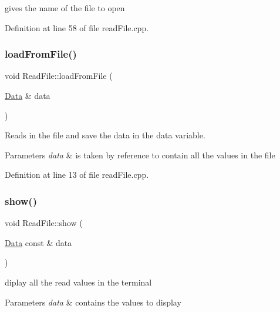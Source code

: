 gives the name of the file to open 



Definition at line 58 of file read\+File.\+cpp.

\mbox{\label{class_read_file_a232df426223b84e4dbb3f964ee4c3177}} 
\subsubsection{\texorpdfstring{load\+From\+File()}{loadFromFile()}}
{\footnotesize\ttfamily void Read\+File\+::load\+From\+File (\begin{DoxyParamCaption}\item[{\mbox{\hyperlink{struct_data}{Data}} \&}]{data }\end{DoxyParamCaption})}



Reads in the file and save the data in the data variable. 


\begin{DoxyParams}{Parameters}
{\em data} & is taken by reference to contain all the values in the file \\
\hline
\end{DoxyParams}


Definition at line 13 of file read\+File.\+cpp.

\mbox{\label{class_read_file_a5efc41b900510ae038dafc23a2563300}} 
\subsubsection{\texorpdfstring{show()}{show()}}
{\footnotesize\ttfamily void Read\+File\+::show (\begin{DoxyParamCaption}\item[{\mbox{\hyperlink{struct_data}{Data}} const \&}]{data }\end{DoxyParamCaption})}



diplay all the read values in the terminal 


\begin{DoxyParams}{Parameters}
{\em data} & contains the values to display \\
\hline
\end{DoxyParams}


